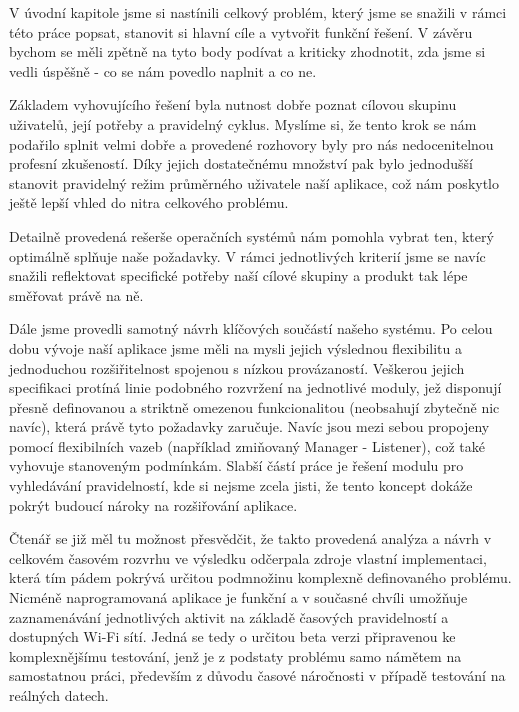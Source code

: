 \documentclass[thesis=M,czech]{FITthesis}[2012/06/26]
\begin{document}
\begin{conclusion}
V úvodní kapitole jsme si nastínili celkový problém, který jsme se snažili v rámci této práce popsat, stanovit si hlavní cíle a vytvořit funkční řešení. V závěru bychom se měli zpětně na tyto body podívat a kriticky zhodnotit, zda jsme si vedli úspěšně - co se nám povedlo naplnit a co ne.

Základem vyhovujícího řešení byla nutnost dobře poznat cílovou skupinu uživatelů, její potřeby a pravidelný cyklus. Myslíme si, že tento krok se nám podařilo splnit velmi dobře a provedené rozhovory byly pro nás nedocenitelnou profesní zkušeností. Díky jejich dostatečnému množství pak bylo jednodušší stanovit pravidelný režim průměrného uživatele naší aplikace, což nám poskytlo ještě lepší vhled do nitra celkového problému.

Detailně provedená rešerše operačních systémů nám pomohla vybrat ten, který optimálně splňuje naše požadavky. V rámci jednotlivých kriterií jsme se navíc snažili reflektovat specifické potřeby naší cílové skupiny a produkt tak lépe směřovat právě na ně.

Dále jsme provedli samotný návrh klíčových součástí našeho systému. Po celou dobu vývoje naší aplikace jsme měli na mysli jejich výslednou flexibilitu a jednoduchou rozšiřitelnost spojenou s nízkou provázaností. Veškerou jejich specifikaci protíná linie podobného rozvržení na jednotlivé moduly, jež disponují přesně definovanou a striktně omezenou funkcionalitou (neobsahují zbytečně nic navíc), která právě tyto požadavky zaručuje. Navíc jsou mezi sebou propojeny pomocí flexibilních vazeb (například zmiňovaný Manager - Listener), což také vyhovuje stanoveným podmínkám. Slabší částí práce je řešení modulu pro vyhledávání pravidelností, kde si nejsme zcela jisti, že tento koncept dokáže pokrýt budoucí nároky na rozšiřování aplikace.

Čtenář se již měl tu možnost přesvědčit, že takto provedená analýza a návrh v celkovém časovém rozvrhu ve výsledku odčerpala zdroje vlastní implementaci, která tím pádem pokrývá určitou podmnožinu komplexně definovaného problému. Nicméně naprogramovaná aplikace je funkční a v současné chvíli umožňuje zaznamenávání jednotlivých aktivit na základě časových pravidelností a dostupných Wi-Fi sítí. Jedná se tedy o určitou beta verzi připravenou ke komplexnějšímu testování, jenž je z podstaty problému samo námětem na samostatnou práci, především z důvodu časové náročnosti v případě testování na reálných datech.
\end{conclusion}
\end{document}
